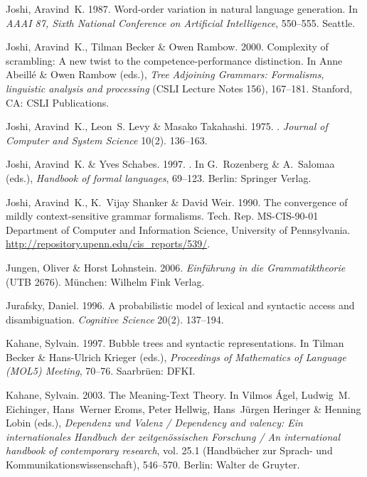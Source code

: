 \begin{thebibliography}{1420}
Joshi, Aravind~K. 1987{}.
\newblock Word-order variation in natural language generation.
\newblock In \emph{{AAAI 87, Sixth National Conference on Artificial
  Intelligence}}, 550--555. Seattle.

Joshi, Aravind~K., Tilman Becker \& Owen Rambow. 2000.
\newblock Complexity of scrambling: {A} new twist to the competence-performance
  distinction.
\newblock In Anne Abeill{\'e} \& Owen Rambow (eds.), \emph{{Tree Adjoining
  Grammars}: Formalisms, linguistic analysis and processing} (CSLI Lecture
  Notes 156), 167--181. Stanford, CA: CSLI Publications.

Joshi, Aravind~K., Leon~S. Levy \& Masako Takahashi. 1975.
.
\newblock \emph{Journal of Computer and System Science} 10(2). 136--163.

Joshi, Aravind~K. \& Yves Schabes. 1997.
.
\newblock In G.~Rozenberg \& A.~Salomaa (eds.), \emph{Handbook of formal
  languages}, 69--123. Berlin: Springer Verlag.

Joshi, Aravind~K., K.~Vijay Shanker \& David Weir. 1990.
\newblock The convergence of mildly context-sensitive grammar formalisms.
\newblock Tech. Rep. MS-CIS-90-01 Department of Computer and Information
  Science, University of Pennsylvania.
\newblock \urlprefix\url{http://repository.upenn.edu/cis_reports/539/}.

Jungen, Oliver \& Horst Lohnstein. 2006.
\newblock \emph{{Einf{\"u}hrung in die Grammatiktheorie}} (UTB 2676).
\newblock M{\"u}nchen: Wilhelm Fink Verlag.

Jurafsky, Daniel. 1996.
\newblock A probabilistic model of lexical and syntactic access and
  disambiguation.
\newblock \emph{Cognitive Science} 20(2). 137--194.

Kahane, Sylvain. 1997.
\newblock Bubble trees and syntactic representations.
\newblock In Tilman Becker \& Hans-Ulrich Krieger (eds.), \emph{Proceedings of
  {Mathematics of Language (MOL5) Meeting}}, 70--76.
  Saar\-br{\"u}en: DFKI.

Kahane, Sylvain. 2003.
\newblock The {Meaning-Text Theory}.
\newblock In Vilmos {\'A}gel, Ludwig~M. Eichinger, Hans~Werner Eroms, Peter
  Hellwig, Hans~J{\"u}rgen Heringer \& Henning Lobin (eds.), \emph{{Dependenz
  und Valenz} / {Dependency} and valency: {Ein internationales Handbuch der
  zeitgen{\"o}ssischen Forschung} / {An} international handbook of contemporary
  research}, vol. 25.1  (Hand\-b{\"u}\-cher zur Sprach- und
  Kommunikationswissenschaft), 546--570. Berlin: Walter de Gruyter.


\end{thebibliography}
